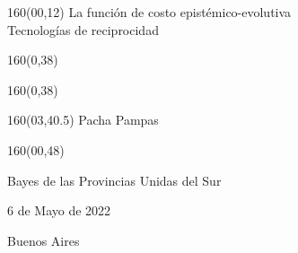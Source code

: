\documentclass[shownotes,aspectratio=169]{beamer}
\begin{document}
\begin{frame}
\begin{textblock}{160}(00,12)
\centering
\huge La función de costo epistémico-evolutiva \\ \LARGE Tecnologías de reciprocidad
\end{textblock}

\begin{textblock}{160}(0,38) \centering
\textcolor{black!85}{}
\end{textblock}
\begin{textblock}{160}(0,38) \centering
\textcolor{black!85}{}
\end{textblock}
\begin{textblock}{160}(03,40.5) \Large \centering
Pacha \hspace{0.75cm} Pampas \hspace{0.065cm}
\end{textblock}


\begin{textblock}{160}(00,48) \centering



Bayes de las Provincias Unidas del Sur

\vspace{1.6cm}

6 de Mayo de 2022

\vspace{.3cm}

Buenos Aires
\end{textblock}



\end{frame}
\end{document}
